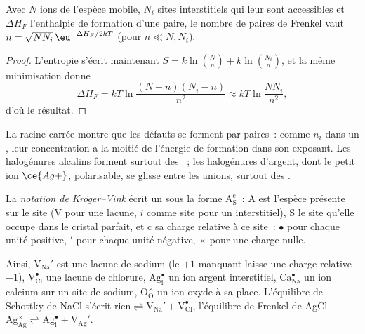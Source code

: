 \begin{proposition}\label{prop:b3:solid-state:frenkel}
Avec $N$ ions de l'espèce mobile, $N_i$ sites interstitiels qui leur sont accessibles et
$\Delta H_F$ l'enthalpie de formation d'une paire, le nombre de paires de Frenkel vaut $n =
\sqrt{NN_i}\,\eu^{-\Delta H_F/2kT}$ (pour $n \ll N, N_i$).
\end{proposition}

\begin{proof}
L'entropie s'écrit maintenant $S = k\ln\binom{N}{n} + k\ln\binom{N_i}{n}$, et la même minimisation donne
\[
  \Delta H_F = kT\ln\frac{(N - n)(N_i - n)}{n^2} \approx kT\ln\frac{NN_i}{n^2},
\]
d'où le résultat.
\end{proof}

La racine carrée montre que les défauts se forment par paires~: comme $n_i$
dans un , leur concentration a la moitié de l'énergie de
formation dans son exposant. Les halogénures alcalins forment surtout des
~; les halogénures d'argent, dont le petit ion
$\ce{Ag+}$, polarisable, se glisse entre les anions, surtout des .

\begin{definition}\label{def:b3:solid-state:kroger-vink}
La \emph{notation de Kröger--Vink} écrit un 
sous la forme $\mathrm{A_S^c}$~: A est l'espèce présente sur le site (V pour une lacune, $i$ comme site
pour un interstitiel), S le site qu'elle occupe dans le cristal parfait, et c sa
charge relative à ce site~: $\bullet$ pour chaque unité positive, $'$ pour chaque unité
négative, $\times$ pour une charge nulle.
\end{definition}

Ainsi, $\mathrm{V_{Na}'}$ est une lacune de sodium (le $+1$ manquant laisse une charge relative $-1$),
$\mathrm{V_{Cl}^{\bullet}}$ une lacune de chlorure, $\mathrm{Ag_i^{\bullet}}$ un ion argent interstitiel, $\mathrm{Ca_{Na}^{\bullet}}$ un ion calcium sur un
site de sodium, $\mathrm{O_O^{\times}}$ un ion oxyde à sa place. L'équilibre de Schottky de NaCl s'écrit
$\text{rien} \rightleftharpoons \mathrm{V_{Na}' + V_{Cl}^{\bullet}}$, l'équilibre de Frenkel de AgCl
$\mathrm{Ag_{Ag}^{\times}} \rightleftharpoons \mathrm{Ag_i^{\bullet} + V_{Ag}'}$.

